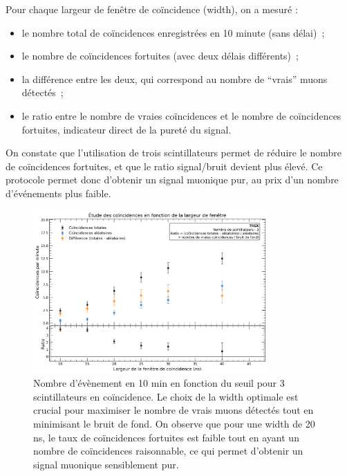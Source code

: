 \documentclass[a4paper,12pt,twoside]{article}
\begin{document}
Pour chaque largeur de fenêtre de coïncidence (width), on a mesuré :
\begin{itemize}
    \item le nombre total de coïncidences enregistrées en 10 minute (sans délai)~;
    \item le nombre de coïncidences fortuites (avec deux délais différents)~;
    \item la différence entre les deux, qui correspond au nombre de “vrais” muons détectés~;
    \item le ratio entre le nombre de vraies coïncidences et le nombre de coïncidences fortuites, indicateur direct de la pureté du signal.
\end{itemize}

On constate que l’utilisation de trois scintillateurs permet de réduire le nombre de coïncidences fortuites, et que le ratio signal/bruit devient plus élevé. Ce protocole permet donc d’obtenir un signal muonique pur, au prix d’un nombre d’événements plus faible.

\begin{figure}[H]
    \centering
    \includegraphics[width=0.8\textwidth]{Images/Coincidences_3_Scintillateurs.png}
    \caption[Nombre d’évènement en 4min en fonction du seuil]{Nombre d’évènement en 10 min en fonction du seuil pour 3 scintillateurs en coïncidence.
    Le choix de la width optimale est crucial pour maximiser le nombre de vrais muons détectés tout en minimisant le bruit de fond. On observe que pour une width de 20 ns, le taux de coïncidences fortuites est faible tout en ayant un nombre de coïncidences raisonnable, ce qui permet d’obtenir un signal muonique sensiblement pur.}
    \label{fig:coincidences_3_scintillateurs}
  \end{figure}

\end{document}
